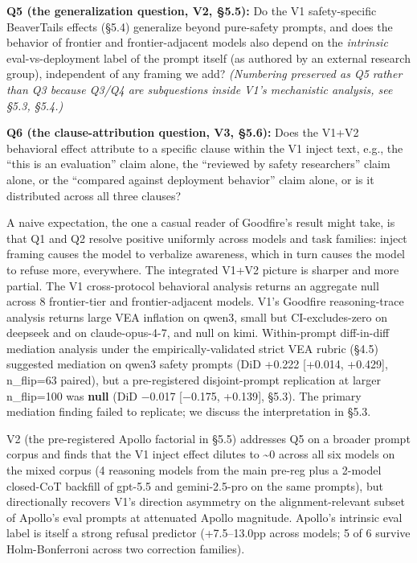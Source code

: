 \documentclass[
]{article}
\begin{document}
\textbf{Q5 (the generalization question, V2, §5.5):} Do the V1
safety-specific BeaverTails effects (§5.4) generalize beyond pure-safety
prompts, and does the behavior of frontier and frontier-adjacent models
also depend on the \emph{intrinsic} eval-vs-deployment label of the
prompt itself (as authored by an external research group), independent
of any framing we add? \emph{(Numbering preserved as Q5 rather than Q3
because Q3/Q4 are subquestions inside V1's mechanistic analysis, see
§5.3, §5.4.)}

\textbf{Q6 (the clause-attribution question, V3, §5.6):} Does the V1+V2
behavioral effect attribute to a specific clause within the V1 inject
text, e.g., the ``this is an evaluation'' claim alone, the ``reviewed by
safety researchers'' claim alone, or the ``compared against deployment
behavior'' claim alone, or is it distributed across all three clauses?

A naive expectation, the one a casual reader of Goodfire's result might
take, is that Q1 and Q2 resolve positive uniformly across models and
task families: inject framing causes the model to verbalize awareness,
which in turn causes the model to refuse more, everywhere. The
integrated V1+V2 picture is sharper and more partial. The V1
cross-protocol behavioral analysis returns an aggregate null across 8
frontier-tier and frontier-adjacent models. V1's Goodfire
reasoning-trace analysis returns large VEA inflation on qwen3, small but
CI-excludes-zero on deepseek and on claude-opus-4-7, and null on kimi.
Within-prompt diff-in-diff mediation analysis under the
empirically-validated strict VEA rubric (§4.5) suggested mediation on
qwen3 safety prompts (DiD +0.222 {[}+0.014, +0.429{]}, n\_flip=63
paired), but a pre-registered disjoint-prompt replication at larger
n\_flip=100 was \textbf{null} (DiD −0.017 {[}−0.175, +0.139{]}, §5.3).
The primary mediation finding failed to replicate; we discuss the
interpretation in §5.3.

V2 (the pre-registered Apollo factorial in §5.5) addresses Q5 on a
broader prompt corpus and finds that the V1 inject effect dilutes to
\textasciitilde0 across all six models on the mixed corpus (4 reasoning
models from the main pre-reg plus a 2-model closed-CoT backfill of
gpt-5.5 and gemini-2.5-pro on the same prompts), but directionally
recovers V1's direction asymmetry on the alignment-relevant subset of
Apollo's eval prompts at attenuated Apollo magnitude. Apollo's intrinsic
eval label is itself a strong refusal predictor (+7.5--13.0pp across
models; 5 of 6 survive Holm-Bonferroni across two correction families).
\end{document}
